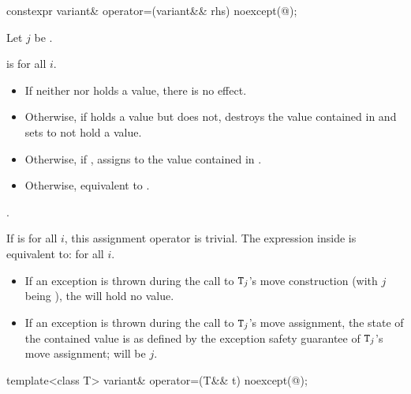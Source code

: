 %
\begin{itemdecl}
constexpr variant& operator=(variant&& rhs) noexcept(@\seebelow@);
\end{itemdecl}

\begin{itemdescr}
\pnum
Let $j$ be .

\pnum
\constraints
{}
 is
 for all $i$.

\pnum
\effects
\begin{itemize}
\item
If neither  nor  holds a value, there is no effect.
\item
Otherwise, if  holds a value but  does not, destroys the value
contained in  and sets  to not hold a value.
\item
Otherwise, if , assigns  to
the value contained in .
\item
Otherwise, equivalent to .
\end{itemize}

\pnum
\returns
{}.

\pnum
\remarks
If 
is  for all $i$, this assignment operator is trivial.
The expression inside  is equivalent to:
 for all $i$.
\begin{itemize}
\item If an exception is thrown during the call to $\texttt{T}_j$'s move construction
(with $j$ being ), the  will hold no value.
\item If an exception is thrown during the call to $\texttt{T}_j$'s move assignment,
the state of the contained value is as defined by the exception safety
guarantee of $\texttt{T}_j$'s move assignment;  will be $j$.
\end{itemize}
\end{itemdescr}

%
\begin{itemdecl}
template<class T> variant& operator=(T&& t) noexcept(@\seebelow@);
\end{itemdecl}

